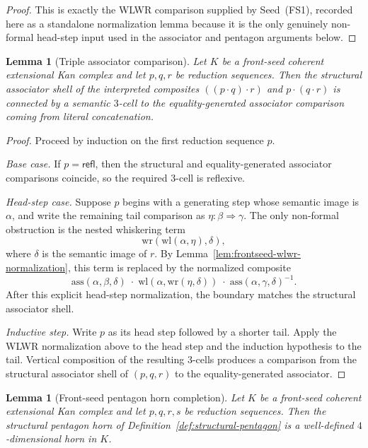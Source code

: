 \documentclass[webpdf,traditional,large,numbered]{oup-authoring-template}
\theoremstyle{thmstyleone}%
\newtheorem{lemma}[theorem]{Lemma}
\theoremstyle{thmstyletwo}%
\theoremstyle{thmstylethree}%
\newcommand{\whiskerLeft}{\mathrm{wl}}
\newcommand{\whiskerRight}{\mathrm{wr}}
\newcommand{\ass}{\mathrm{ass}}
\begin{document}
\begin{proof}
This is exactly the WLWR comparison supplied by Seed~(FS1), recorded here as a
standalone normalization lemma because it is the only genuinely non-formal
head-step input used in the associator and pentagon arguments below.
\end{proof}

\begin{lemma}[Triple associator comparison]\label{lem:frontseed-assoc}
Let $K$ be a front-seed coherent extensional Kan complex and let $p,q,r$ be
reduction sequences.  Then the structural associator shell of the interpreted
composites $((p\cdot q)\cdot r)$ and $p\cdot(q\cdot r)$ is connected by a
semantic $3$-cell to the equality-generated associator comparison coming from
literal concatenation.
\end{lemma}

\begin{proof}
Proceed by induction on the first reduction sequence $p$.

\smallskip
\noindent
\emph{Base case.} If $p=\mathsf{refl}$, then the structural and
equality-generated associator comparisons coincide, so the required $3$-cell is
reflexive.

\smallskip
\noindent
\emph{Head-step case.} Suppose $p$ begins with a generating step whose semantic
image is $\alpha$, and write the remaining tail comparison as
$\eta:\beta\Rightarrow\gamma$.  The only non-formal obstruction is the nested
whiskering term
\[
\whiskerRight(\whiskerLeft(\alpha,\eta),\delta),
\]
where $\delta$ is the semantic image of $r$.  By
Lemma~\ref{lem:frontseed-wlwr-normalization}, this term is replaced by the
normalized composite
\[
\ass(\alpha,\beta,\delta)\;\cdot\;
\whiskerLeft(\alpha,\whiskerRight(\eta,\delta))\;\cdot\;
\ass(\alpha,\gamma,\delta)^{-1}.
\]
After this explicit head-step normalization, the boundary matches the structural
associator shell.

\smallskip
\noindent
\emph{Inductive step.} Write $p$ as its head step followed by a shorter tail.
Apply the WLWR normalization above to the head step and the induction
hypothesis to the tail.  Vertical composition of the resulting $3$-cells
produces a comparison from the structural associator shell of $(p,q,r)$ to the
equality-generated associator.
\end{proof}

\begin{lemma}[Front-seed pentagon horn completion]\label{lem:frontseed-pentagon}
Let $K$ be a front-seed coherent extensional Kan complex and let $p,q,r,s$ be
reduction sequences.  Then the structural pentagon horn of
Definition~\ref{def:structural-pentagon} is a well-defined $4$-dimensional horn
in $K$.
\end{lemma}
\end{document}
